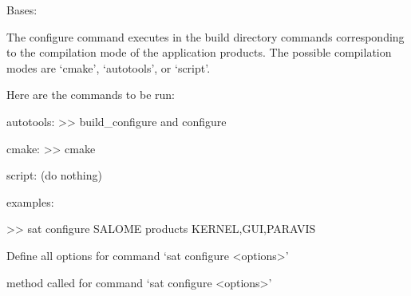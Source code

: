 \documentclass[a4paper,10pt,english]{sphinxmanual}
\begin{document}
\begin{fulllineitems}
\label{\detokenize{apidoc_commands/commands:commands.configure.Command}}
Bases: 

The configure command executes in the build directory commands
corresponding to the compilation mode of the application products.
The possible compilation modes are ‘cmake’, ‘autotools’, or ‘script’.

\begin{DUlineblock}{0em}
\item[] Here are the commands to be run:
\item[]
\begin{DUlineblock}{\DUlineblockindent}
\item[] autotools: \textgreater{}\textgreater{} build\_configure and configure
\item[] cmake:     \textgreater{}\textgreater{} cmake
\item[] script:    (do nothing)
\item[] 
\end{DUlineblock}
\item[] examples:
\item[] \textgreater{}\textgreater{} sat configure SALOME \textendash{}products KERNEL,GUI,PARAVIS
\end{DUlineblock}

\begin{fulllineitems}
\label{\detokenize{apidoc_commands/commands:commands.configure.Command.getParser}}
Define all options for command ‘sat configure \textless{}options\textgreater{}’

\end{fulllineitems}


\begin{fulllineitems}
\label{\detokenize{apidoc_commands/commands:commands.configure.Command.name}}
\end{fulllineitems}


\begin{fulllineitems}
\label{\detokenize{apidoc_commands/commands:commands.configure.Command.run}}
method called for command ‘sat configure \textless{}options\textgreater{}’

\end{fulllineitems}


\end{fulllineitems}
\end{document}
